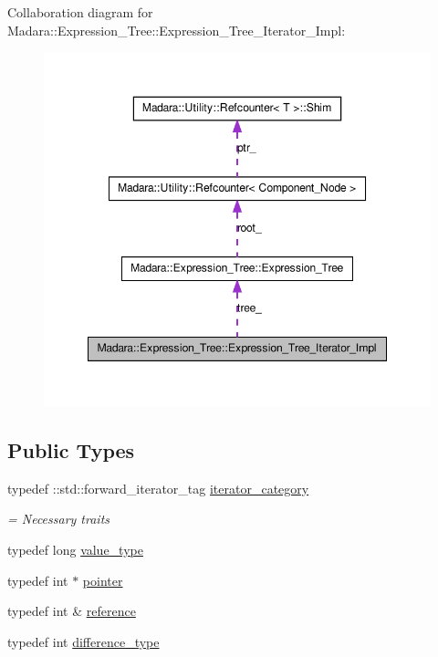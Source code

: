 Collaboration diagram for Madara::Expression\_\-Tree::Expression\_\-Tree\_\-Iterator\_\-Impl:
\nopagebreak
\begin{figure}[H]
\begin{center}
\leavevmode
\includegraphics[width=348pt]{d2/d54/classMadara_1_1Expression__Tree_1_1Expression__Tree__Iterator__Impl__coll__graph}
\end{center}
\end{figure}
\subsection*{Public Types}
\begin{DoxyCompactItemize}
\item 
typedef ::std::forward\_\-iterator\_\-tag \hyperlink{classMadara_1_1Expression__Tree_1_1Expression__Tree__Iterator__Impl_a59d9cb2efd705e21684d901de09399c7}{iterator\_\-category}
\begin{DoxyCompactList}\small\item\em = Necessary traits \item\end{DoxyCompactList}\item 
typedef long \hyperlink{classMadara_1_1Expression__Tree_1_1Expression__Tree__Iterator__Impl_a7905c3a8d6cb961d826aff8bbd10e520}{value\_\-type}
\item 
typedef int $\ast$ \hyperlink{classMadara_1_1Expression__Tree_1_1Expression__Tree__Iterator__Impl_a33e128179eed32fd363d0f426ed313a1}{pointer}
\item 
typedef int \& \hyperlink{classMadara_1_1Expression__Tree_1_1Expression__Tree__Iterator__Impl_adbfbf382a07c981d136ea739c913aeab}{reference}
\item 
typedef int \hyperlink{classMadara_1_1Expression__Tree_1_1Expression__Tree__Iterator__Impl_ae0238cb942a1398b7cd91dffe4c5ba3c}{difference\_\-type}
\end{DoxyCompactItemize}

